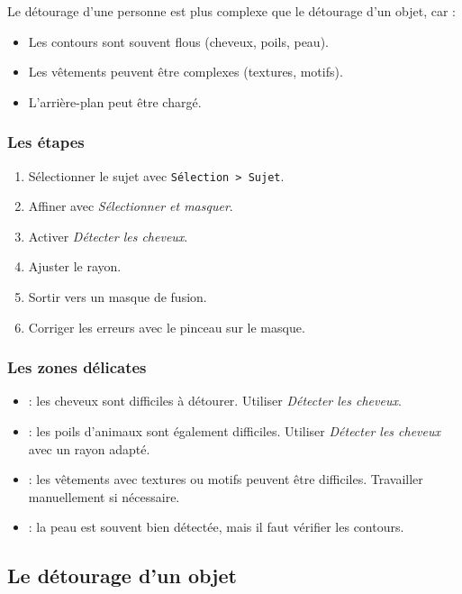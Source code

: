 Le détourage d'une personne est plus complexe que le détourage d'un objet, car :

\begin{itemize}
    \item Les contours sont souvent flous (cheveux, poils, peau).
    \item Les vêtements peuvent être complexes (textures, motifs).
    \item L'arrière-plan peut être chargé.
\end{itemize}

\subsubsection{Les étapes}

\begin{enumerate}
    \item Sélectionner le sujet avec \texttt{Sélection > Sujet}.
    \item Affiner avec \emph{Sélectionner et masquer}.
    \item Activer \emph{Détecter les cheveux}.
    \item Ajuster le rayon.
    \item Sortir vers un masque de fusion.
    \item Corriger les erreurs avec le pinceau sur le masque.
\end{enumerate}

\subsubsection{Les zones délicates}

\begin{itemize}
    \item {} : les cheveux sont difficiles à détourer. Utiliser \emph{Détecter les cheveux}.
    \item {} : les poils d'animaux sont également difficiles. Utiliser \emph{Détecter les cheveux} avec un rayon adapté.
    \item {} : les vêtements avec textures ou motifs peuvent être difficiles. Travailler manuellement si nécessaire.
    \item {} : la peau est souvent bien détectée, mais il faut vérifier les contours.
\end{itemize}

\subsection{Le détourage d'un objet}

